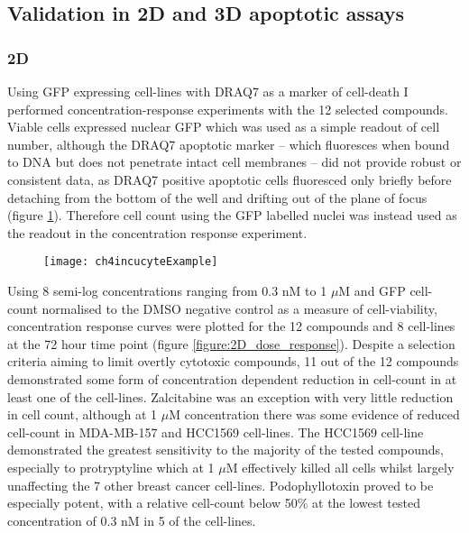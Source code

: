 \documentclass[a4paper,11pt,twoside,openright]{scrbook}
\begin{document}
\subsection{Validation in 2D and 3D apoptotic assays}

\subsubsection{2D}

Using GFP expressing cell-lines with DRAQ7 as a marker of cell-death I performed concentration-response experiments 
with the 12 selected compounds.
Viable cells expressed nuclear GFP which was used as a simple readout of cell number, although the DRAQ7 apoptotic 
marker -- which fluoresces when bound to DNA but does not penetrate intact cell membranes -- did not provide robust or 
consistent data, as DRAQ7 positive apoptotic cells fluoresced only briefly before detaching from the bottom of the well 
and drifting out of the plane of focus (figure \ref{figure:incucyte_example}).
Therefore cell count using the GFP labelled nuclei was instead used as the readout in the concentration response 
experiment.

\begin{figure}[H]
     {
    \texttt{[image: ch4incucyteExample]}
    \label{figure:incucyte_example}
    }
\end{figure}

Using 8 semi-log concentrations ranging from 0.3 nM to 1 $\mu$M and GFP cell-count normalised to the DMSO negative 
control as a measure of cell-viability, concentration response curves were plotted for the 12 compounds and 8 
cell-lines at the 72 hour time point (figure \ref{figure:2D_dose_response}).
Despite a selection criteria aiming to limit overtly cytotoxic compounds, 11 out of the 12 compounds demonstrated some 
form of concentration dependent reduction in cell-count in at least one of the cell-lines.
Zalcitabine was an exception with very little reduction in cell count, although at 1 $\mu$M concentration there was 
some evidence of reduced cell-count in MDA-MB-157 and HCC1569 cell-lines.
The HCC1569 cell-line demonstrated the greatest sensitivity to the majority of the tested compounds, especially to 
protryptyline which at 1 $\mu$M effectively killed all cells whilst largely unaffecting the 7 other breast cancer 
cell-lines.
Podophyllotoxin proved to be especially potent, with a relative cell-count below 50\% at the lowest tested 
concentration of 0.3 nM in 5 of the cell-lines.
\end{document}

